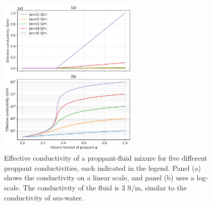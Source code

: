 \begin{figure}
    \begin{center}
    \includegraphics[width=0.6\textwidth]{figures/phys_prop_model/emt_spherical_particles.png}
    \end{center}
\caption{
    Effective conductivity of a proppant-fluid mixure for five different proppant
    conductivities, each indicated in the legend. Panel (a) shows the conductivity on a linear
    scale, and panel (b) uses a log-scale.
    The conductivity of the fluid is 3 S/m, similar to the conductivity of sea-water.
}
\label{fig:emt_spherical_particles}
\end{figure}
